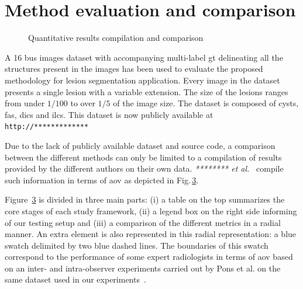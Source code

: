 \section{Method evaluation and comparison} 

\begin{figure}[t]
  \begin{subfigure}[b]{\textwidth}
    {\tiny }
    \label{fig:surveyResults:survey}
  \end{subfigure}
  \begin{subfigure}[b]{\textwidth}
    {\tiny  }
    \label{fig:surveyResults:comparison}
  \end{subfigure}
  \caption{Quantitative results compilation and comparison}
  \label{fig:surveyResults}
\end{figure}

A 16 \ac{bus} images dataset with accompanying multi-label \ac{gt} delineating all the structures present in the images has been used to evaluate the proposed methodology for lesion segmentation application.
Every image in the dataset presents a single lesion with a variable extension. 
The size of the lesions ranges from under $1/100$ to over $1/5$ of the image size.
The dataset is composed of cysts, \acp{fa}, \acp{dic} and \acp{ilc}. This dataset is now publicly available at \texttt{http://*************}

Due to the lack of publicly available dataset and source code, a comparison between the different methods can only be limited to a compilation of results provided by the different authors on their own data. \emph{******** et al.}~\cite{massich2013phd} compile such information in terms of \ac{aov} as depicted in Fig.\,\ref{fig:surveyResults}.

Figure~\ref{fig:surveyResults} is divided in three main parts: (i) a table on the top summarizes the core stages of each study framework, (ii) a legend box on the right side informing of our testing setup and (iii) a comparison of the different metrics in a radial manner. An extra element is also represented in this radial representation: a blue swatch delimited by two blue dashed lines. The boundaries of this swatch correspond to the performance of some expert radiologists in terms of \ac{aov} based on an inter- and intra-observer experiments carried out by Pons et al. on the same dataset used in our experiments~\cite{gerard2013}.

